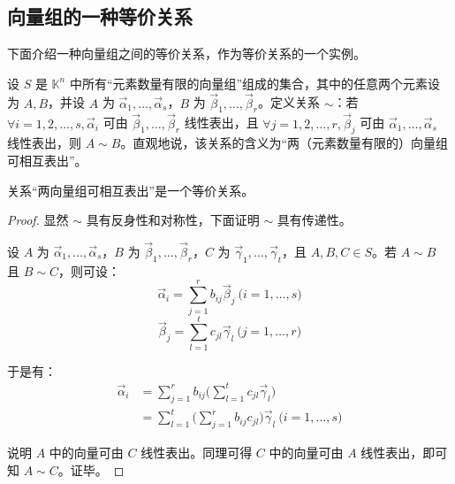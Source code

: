 \subsection{向量组的一种等价关系}

下面介绍一种向量组之间的等价关系，作为等价关系的一个实例。

设 $S$ 是 $\mathbb K^n$ 中所有“元素数量有限的向量组”组成的集合，其中的任意两个元素设为 $A, B$，并设 $A$ 为 $\vec \alpha_1, \ldots, \vec \alpha_s$，$B$ 为 $\vec \beta_1, \ldots, \vec \beta_r$。定义关系 $\sim$：若 $\forall i = 1, 2, \ldots, s, \vec \alpha_i$ 可由 $\vec \beta_1, \ldots, \vec \beta_r$ 线性表出，且 $\forall j = 1, 2, \ldots, r, \vec \beta_j$ 可由 $\vec \alpha_1, \ldots, \vec \alpha_s$ 线性表出，则 $A \sim B$。直观地说，该关系的含义为“两（元素数量有限的）向量组可相互表出”。

\begin{theorem}
	关系“两向量组可相互表出”是一个等价关系。
\end{theorem}

\begin{proof}
	显然 $\sim$ 具有反身性和对称性，下面证明 $\sim$ 具有传递性。

	设 $A$ 为 $\vec \alpha_1, \ldots, \vec \alpha_s$，$B$ 为 $\vec \beta_1, \ldots, \vec \beta_r$，$C$ 为 $\vec \gamma_1, \ldots, \vec \gamma_t$，且 $A, B, C \in S$。若 $A \sim B$ 且 $B \sim C$，则可设：
	$$
	\vec \alpha_i = \sum\limits_{j = 1}^r b_{ij} \vec \beta_j \pod{i = 1, \ldots, s}
	$$$$
	\vec \beta_j = \sum\limits_{l = 1}^t c_{jl} \vec \gamma_l \pod{j = 1, \ldots, r}
	$$

	于是有：
	$$
	\begin{aligned}
		\vec \alpha_i &= \sum\limits_{j = 1}^r b_{ij} \biggl( \sum\limits_{l = 1}^t c_{jl} \vec \gamma_l \biggr)
		\\&=
		\sum\limits_{l = 1}^t \biggl( \sum\limits_{j = 1}^r b_{ij} c_{jl} \biggr) \vec \gamma_l \pod{i = 1, \ldots, s}
	\end{aligned}
	$$

	说明 $A$ 中的向量可由 $C$ 线性表出。同理可得 $C$ 中的向量可由 $A$ 线性表出，即可知 $A \sim C$。证毕。
\end{proof}